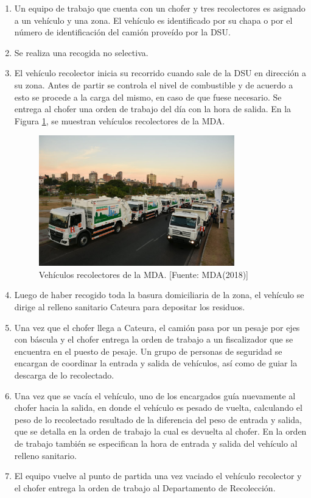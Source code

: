 \begin{enumerate}
\item Un equipo de trabajo que cuenta con un chofer y tres recolectores es asignado a un vehículo y una zona. El vehículo es identificado por su chapa o por el número de identificación del camión proveído por la DSU.
\item Se realiza una recogida no selectiva.
\item El vehículo recolector inicia su recorrido cuando sale de la DSU en dirección a su zona. Antes de partir se controla el nivel de combustible y de acuerdo a esto se procede a la carga del mismo, en caso de que fuese necesario. Se entrega al chofer una orden de trabajo del día con la hora de salida. En la Figura \ref{fig:vehiculoRecolectorMDA}, se muestran vehículos recolectores de la MDA.

\begin{figure}[H]
    \centering
    \includegraphics[width=8.5cm]{camion_recolector_mda.png}
    \caption{Vehículos recolectores de la MDA. [Fuente: MDA(2018)]}
    \label{fig:vehiculoRecolectorMDA}
\end{figure}

\item Luego de haber recogido toda la basura domiciliaria de la zona, el vehículo se dirige al relleno sanitario Cateura para depositar los residuos. 
\item Una vez que el chofer llega a Cateura, el camión pasa por un pesaje por ejes con báscula y el chofer entrega la orden de trabajo a un fiscalizador que se encuentra en el puesto de pesaje. Un grupo de personas de seguridad se encargan de coordinar la entrada y salida de vehículos, así como de guiar la descarga de lo recolectado. 
\item Una vez que se vacía el vehículo, uno de los encargados guía nuevamente al chofer hacia la salida, en donde el vehículo es pesado de vuelta, calculando el peso de lo recolectado resultado de la diferencia del peso de entrada y salida, que se detalla en la orden de trabajo la cual es devuelta al chofer. En la orden de trabajo también se especifican la hora de entrada y salida del vehículo al relleno sanitario.
\item El equipo vuelve al punto de partida una vez vaciado el vehículo recolector y el chofer entrega la orden de trabajo al Departamento de Recolección.  
\end{enumerate}

